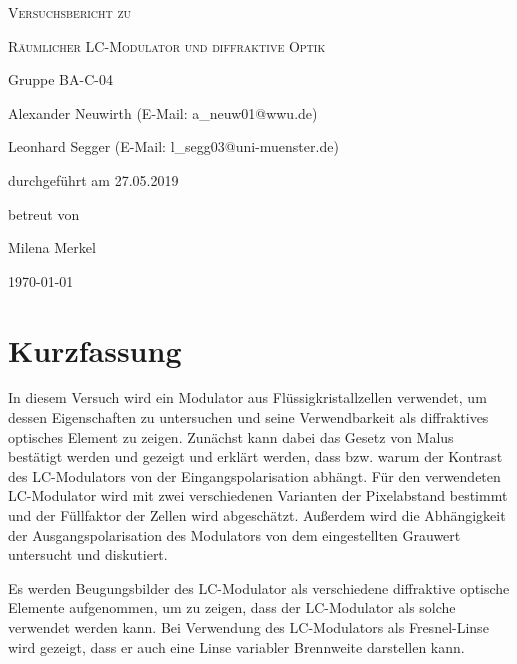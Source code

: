 \documentclass[
	a4paper,
	12pt,
	pagesize,
	ngerman
]{scrartcl}
\begin{document}
	\begin{titlepage}
		\centering
		{\scshape\LARGE Versuchsbericht zu \par}
		\vspace{1cm}
		{\scshape\huge Räumlicher LC-Modulator und diffraktive Optik \par}
		\vspace{2.5cm}
		{\LARGE Gruppe BA-C-04 \par}
		\vspace{0.5cm}

		{\large Alexander Neuwirth (E-Mail: a\_neuw01@wwu.de) \par}
		{\large Leonhard Segger (E-Mail: l\_segg03@uni-muenster.de) \par}
		\vfill

		durchgeführt am 27.05.2019\par
		betreut von\par
		{\large Milena Merkel}

		\vfill

		{\large \today\par}
	\end{titlepage}
	\tableofcontents
	\newpage

	\section{Kurzfassung}
	In diesem Versuch wird ein Modulator aus Flüssigkristallzellen verwendet, um dessen Eigenschaften zu untersuchen und seine Verwendbarkeit als diffraktives optisches Element zu zeigen.
	Zunächst kann dabei das Gesetz von Malus bestätigt werden und gezeigt und erklärt werden, dass bzw. warum der Kontrast des LC-Modulators von der Eingangspolarisation abhängt.
	Für den verwendeten LC-Modulator wird mit zwei verschiedenen Varianten der Pixelabstand bestimmt und der Füllfaktor der Zellen wird abgeschätzt.
	Außerdem wird die Abhängigkeit der Ausgangspolarisation des Modulators von dem eingestellten Grauwert untersucht und diskutiert.

	Es werden Beugungsbilder des LC-Modulator als verschiedene diffraktive optische Elemente aufgenommen, um zu zeigen, dass der LC-Modulator als solche verwendet werden kann.
	Bei Verwendung des LC-Modulators als Fresnel-Linse wird gezeigt, dass er auch eine Linse variabler Brennweite darstellen kann.
\end{document}
